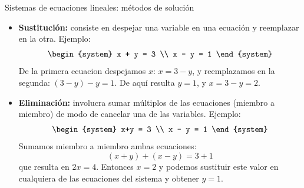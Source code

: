 \documentclass[9pt, aspectratio=169]{beamer}
\begin{document}
\begin{frame}{Sistemas de ecuaciones lineales: métodos de solución}
\begin{itemize}
    \item \textbf{Sustitución:} consiste en despejar una variable en una ecuación y reemplazar en la otra. Ejemplo:
        \[ \begin{system} x + y = 3 \\ x - y = 1 \end{system} \]
        De la primera ecuacion despejamos $x$: $x = 3 - y$, y reemplazamos en la segunda: $(3-y) - y = 1$. De aquí resulta $y = 1$, y $x = 3 - y = 2$. \pause \medskip
    \item \textbf{Eliminación:} involucra sumar múltiplos de las ecuaciones (miembro a miembro) de modo de cancelar una de las variables. Ejemplo:
        \[ \begin{system} x+y = 3 \\ x - y = 1 \end{system} \]
        Sumamos miembro a miembro ambas ecuaciones:
        \[ (x + y) + (x - y) = 3 + 1 \]
        que resulta en $2x = 4$. Entonces $x=2$ y podemos sustituir este valor en cualquiera de las ecuaciones del sistema y obtener $y = 1$.
\end{itemize}
\end{frame}
\end{document}
